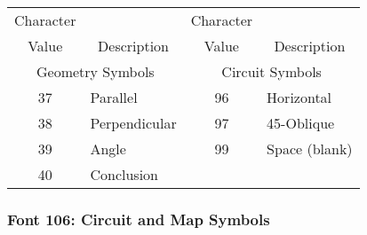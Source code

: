 \begin{tabular}{|c|l|c|l|}
\hline
\multicolumn{1}{|c|}{Character}
& & \multicolumn{1}{|c|}{Character}&\\
\multicolumn{1}{|c|}{Value}
&\multicolumn{1}{|c|}{Description}
&\multicolumn{1}{|c|}{Value}
&\multicolumn{1}{|c|}{Description}\\
\hline
\multicolumn{2}{|c|}{Geometry Symbols} 
&\multicolumn{2}{|c|}{Circuit Symbols}\\
\hline
37 & Parallel & 96 & Horizontal\\
38 & Perpendicular & 97 & 45-Oblique\\
39 & Angle & 99 & Space (blank)\\ 
40 & Conclusion & & \\ \hline
\end{tabular}
\newpage
\subsubsection{Font 106: Circuit and Map Symbols}
